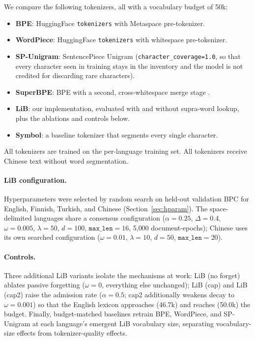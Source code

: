 \documentclass[pdflatex,sn-apa]{sn-jnl}
\begin{document}
We compare the following tokenizers, all with a vocabulary budget of 50k:

\begin{itemize}
  \item \textbf{BPE}: HuggingFace \texttt{tokenizers} with Metaspace
        pre-tokenizer.
  \item \textbf{WordPiece}: HuggingFace \texttt{tokenizers} with whitespace
        pre-tokenizer.
  \item \textbf{SP-Unigram}: SentencePiece Unigram
        (\texttt{character\_coverage=1.0}, so that every character seen in
        training stays in the inventory and the model is not credited for
        discarding rare characters).
  \item \textbf{SuperBPE}: BPE with a second, cross-whitespace merge stage
        \citep{liu2025superbpe}.%
  \item \textbf{LiB}: our implementation, evaluated with and without
        supra-word lookup, plus the ablations and controls below.
  \item \textbf{Symbol}: a baseline tokenizer that segments every single character.
\end{itemize}

All tokenizers are trained on the per-language training set.
All tokenizers receive Chinese text without word segmentation.

\paragraph{LiB configuration.}
Hyperparameters were selected by random search on held-out validation BPC for
English, Finnish, Turkish, and Chinese (Section~\ref{sec:hparam}).
The space-delimited languages share a consensus configuration
($\alpha{=}0.25$, $\Delta{=}0.4$, $\omega{=}0.005$, $\lambda{=}50$,
$d{=}100$, $\texttt{max\_len}{=}16$, 5{,}000 document-epochs); Chinese uses
its own searched configuration ($\omega{=}0.01$, $\lambda{=}10$, $d{=}50$,
$\texttt{max\_len}{=}20$).

\paragraph{Controls.}
Three additional LiB variants isolate the mechanisms at work:
LiB (no forget) ablates passive forgetting ($\omega{=}0$, everything
else unchanged); LiB (cap) and LiB (cap2) raise the admission
rate ($\alpha{=}0.5$; cap2 additionally weakens decay to $\omega{=}0.001$) so
that the English lexicon approaches (46.7k) and reaches (50.0k) the budget.
Finally, budget-matched baselines retrain BPE, WordPiece, and
SP-Unigram at each language's emergent LiB vocabulary size, separating
vocabulary-size effects from tokenizer-quality effects.
\end{document}
